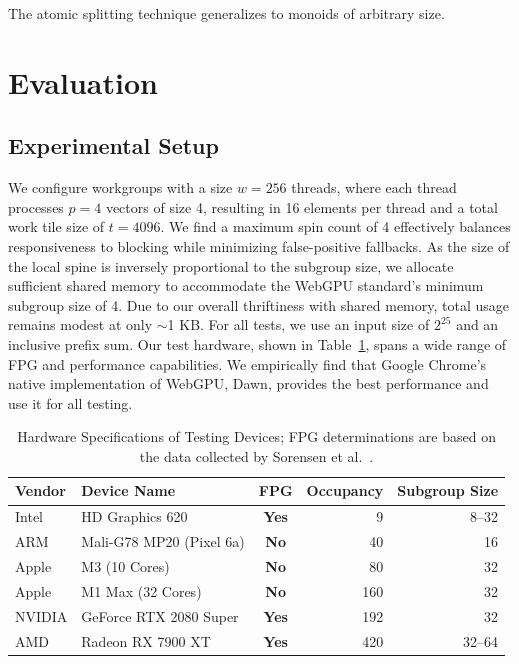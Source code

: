 \documentclass[sigconf,screen]{acmart}
\begin{document}
The atomic splitting technique generalizes to monoids of arbitrary size.

\section{Evaluation}
\subsection{Experimental Setup}
We configure workgroups with a size $w = 256$ threads, where each thread processes $p = 4$ vectors of size 4, resulting in 16 elements per thread and a total work tile size of $t = 4096$. We find a maximum spin count of 4 effectively balances responsiveness to blocking while minimizing false-positive fallbacks. As the size of the local spine is inversely proportional to the subgroup size, we allocate sufficient shared memory to accommodate the WebGPU standard's minimum subgroup size of 4. Due to our overall thriftiness with shared memory, total usage remains modest at only $\sim$1 KB\@. For all tests, we use an input size of $2^{25}$ and an inclusive prefix sum. Our test hardware, shown in Table~\ref{tab:hardware}, spans a wide range of FPG and performance capabilities. We empirically find that Google Chrome's native implementation of WebGPU, Dawn, provides the best performance and use it for all testing.
\begin{table}
  \centering
  \begin{tabular}{l l c r r}
    \toprule
    Vendor & Device Name            & FPG         & Occupancy & Subgroup Size \\
    \midrule
    Intel  & HD Graphics 620          & \textbf{Yes} & 9         & 8--32         \\
    ARM    & Mali-G78 MP20 (Pixel 6a) & \textbf{No}  & 40        & 16            \\
    Apple  & M3     (10 Cores)        & \textbf{No}  & 80        & 32            \\
    Apple  & M1 Max (32 Cores)        & \textbf{No}  & 160       & 32            \\
    NVIDIA & GeForce RTX 2080 Super   & \textbf{Yes} & 192       & 32            \\
    AMD    & Radeon RX 7900 XT        & \textbf{Yes} & 420       & 32--64        \\
    \bottomrule
  \end{tabular}
  \caption{Hardware Specifications of Testing Devices; FPG determinations are based on the data collected by Sorensen et al.~\cite{sorensen2021}.\label{tab:hardware}}
\end{table}
\end{document}
